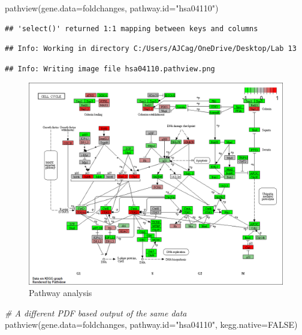 \documentclass[
]{article}
\newenvironment{Shaded}{\begin{snugshade}}{\end{snugshade}}
\newcommand{\AttributeTok}[1]{\textcolor[rgb]{0.77,0.63,0.00}{#1}}
\newcommand{\CommentTok}[1]{\textcolor[rgb]{0.56,0.35,0.01}{\textit{#1}}}
\newcommand{\ConstantTok}[1]{\textcolor[rgb]{0.00,0.00,0.00}{#1}}
\newcommand{\FunctionTok}[1]{\textcolor[rgb]{0.00,0.00,0.00}{#1}}
\newcommand{\NormalTok}[1]{#1}
\newcommand{\StringTok}[1]{\textcolor[rgb]{0.31,0.60,0.02}{#1}}
\begin{document}
\begin{Shaded}
\begin{Highlighting}[]
\FunctionTok{pathview}\NormalTok{(}\AttributeTok{gene.data=}\NormalTok{foldchanges, }\AttributeTok{pathway.id=}\StringTok{"hsa04110"}\NormalTok{)}
\end{Highlighting}
\end{Shaded}

\begin{verbatim}
## 'select()' returned 1:1 mapping between keys and columns
\end{verbatim}

\begin{verbatim}
## Info: Working in directory C:/Users/AJCag/OneDrive/Desktop/Lab 13
\end{verbatim}

\begin{verbatim}
## Info: Writing image file hsa04110.pathview.png
\end{verbatim}

\begin{figure}
\centering
\includegraphics{hsa04110.pathview.png}
\caption{Pathway analysis}
\end{figure}

\begin{Shaded}
\begin{Highlighting}[]
\CommentTok{\# A different PDF based output of the same data}
\FunctionTok{pathview}\NormalTok{(}\AttributeTok{gene.data=}\NormalTok{foldchanges, }\AttributeTok{pathway.id=}\StringTok{"hsa04110"}\NormalTok{, }\AttributeTok{kegg.native=}\ConstantTok{FALSE}\NormalTok{)}
\end{Highlighting}
\end{Shaded}
\end{document}
